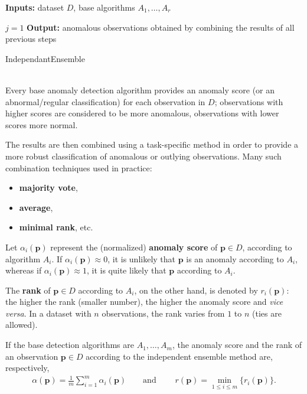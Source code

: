\begin{algorithm}[t]
\SetAlgoLined
\textbf{Inputs:} dataset $D$, base algorithms $A_1,\ldots,A_r$ 

$j=1$\;
\textbf{Output:} anomalous observations obtained by combining the results of all previous steps 
\caption{IndependantEnsemble}\label{algInd}
\end{algorithm}
\ \\
\noindent Every base anomaly detection algorithm provides an a\-no\-ma\-ly score (or an abnormal/regular classification) for each observation in $D$; observations with higher scores are considered to be more anomalous, observations with lower scores more normal. \par The results are then combined using a task-specific method in order to provide a more robust classification of anomalous or outlying observations. 
\newl Many such combination techniques used in practice:  \begin{itemize}[noitemsep]
\item \textbf{majority vote}, 
\item \textbf{average}, 
\item \textbf{minimal rank}, etc. \end{itemize}  
Let $\alpha_i(\mathbf{p})$ represent the (normalized) \textbf{anomaly score} of $\mathbf{p}\in D$, according to algorithm $A_i$. If $\alpha_i(\mathbf{p})\approx 0$, it is unlikely that $\mathbf{p}$ is an anomaly according to $A_i$, whereas if $\alpha_i(\mathbf{p})\approx 1$, it is quite likely that $\mathbf{p}$ according to $A_i$. \par The \textbf{rank} of $\mathbf{p}\in D$ according to $A_i$, on the other hand, is denoted by $r_i(\mathbf{p})$: the higher the rank (smaller number), the higher the anomaly score and \textit{vice versa}. In a dataset with  $n$ observations, the rank varies from $1$ to $n$ (ties are allowed). 
\par If the base detection algorithms are $A_1, \ldots, A_m$, the anomaly score and the rank of an observation $\mathbf{p}\in D$ according to the independent ensemble method are, respectively, 
\begin{align*}
\alpha(\mathbf{p})=\frac{1}{m}\sum_{i=1}^{m}\alpha_i(\mathbf{p}) \qquad \text{and}\; \qquad r(\mathbf{p}) =\min_{1\leq i \leq m} \{r_i(\mathbf{p})\}.
\end{align*}
